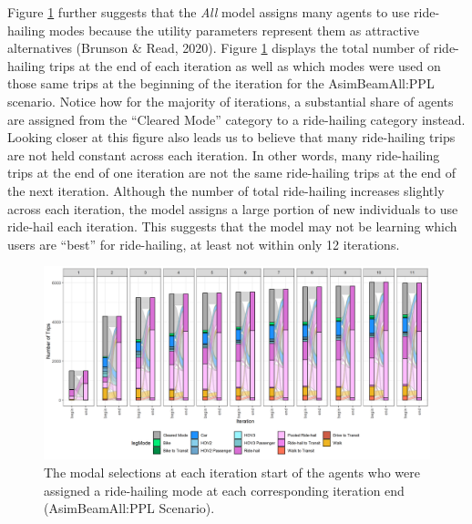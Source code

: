 \documentclass[fancy, masters]{byuthesis}
\begin{document}
Figure \ref{fig:sankey2} further suggests that the \emph{All} model assigns many agents to use ride-hailing modes because the utility parameters represent them as attractive alternatives (Brunson \& Read, 2020). Figure \ref{fig:sankey2} displays the total number of ride-hailing trips at the end of each iteration as well as which modes were used on those same trips at the beginning of the iteration for the AsimBeamAll:PPL scenario. Notice how for the majority of iterations, a substantial share of agents are assigned from the ``Cleared Mode'' category to a ride-hailing category instead. Looking closer at this figure also leads us to believe that many ride-hailing trips are not held constant across each iteration. In other words, many ride-hailing trips at the end of one iteration are not the same ride-hailing trips at the end of the next iteration. Although the number of total ride-hailing increases slightly across each iteration, the model assigns a large portion of new individuals to use ride-hail each iteration. This suggests that the model may not be learning which users are ``best'' for ride-hailing, at least not within only 12 iterations.

\begin{figure}

\centering
\includegraphics[width = 1.05\paperwidth]{planshifts_facet.png}
\caption[Trips that switch to ride-hail by iteration.]{The modal selections at each iteration start of the agents who were assigned a ride-hailing mode at each corresponding iteration end (AsimBeamAll:PPL Scenario).}
\label{fig:sankey2}

\end{figure}
\end{document}

